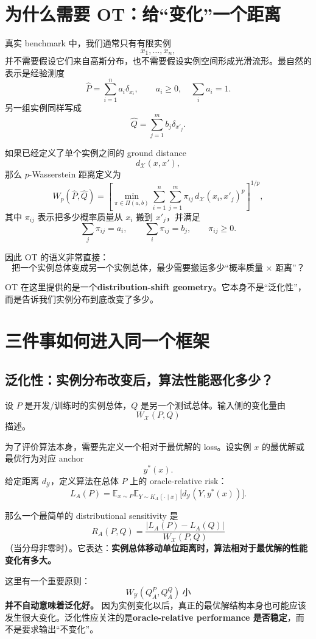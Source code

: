\documentclass[11pt,a4paper]{ctexart}
\begin{document}
\section{为什么需要 OT：给“变化”一个距离}

真实 benchmark 中，我们通常只有有限实例
\[
x_1,\ldots,x_n,
\]
并不需要假设它们来自高斯分布，也不需要假设实例空间形成光滑流形。最自然的表示是经验测度
\[
\widehat P=\sum_{i=1}^n a_i\delta_{x_i},
\qquad a_i\ge 0,\quad \sum_i a_i=1.
\]
另一组实例同样写成
\[
\widehat Q=\sum_{j=1}^m b_j\delta_{x'_j}.
\]

如果已经定义了单个实例之间的 ground distance
\[
d_{\mathcal X}(x,x'),
\]
那么 $p$-Wasserstein 距离定义为
\[
W_p(\widehat P,\widehat Q)
=
\left[
\min_{\pi\in\Pi(a,b)}
\sum_{i=1}^n\sum_{j=1}^m
\pi_{ij}\,d_{\mathcal X}(x_i,x'_j)^p
\right]^{1/p},
\]
其中 $\pi_{ij}$ 表示把多少概率质量从 $x_i$ 搬到 $x'_j$，并满足
\[
\sum_j\pi_{ij}=a_i,
\qquad
\sum_i\pi_{ij}=b_j,
\qquad
\pi_{ij}\ge 0.
\]

因此 OT 的语义非常直接：
\[
\boxed{\text{把一个实例总体变成另一个实例总体，最少需要搬运多少“概率质量 $\times$ 距离”？}}
\]

OT 在这里提供的是一个\textbf{distribution-shift geometry}。它本身不是“泛化性”，而是告诉我们实例分布到底改变了多少。

\section{三件事如何进入同一个框架}

\subsection{泛化性：实例分布改变后，算法性能恶化多少？}

设 $P$ 是开发/训练时的实例总体，$Q$ 是另一个测试总体。输入侧的变化量由
\[
W_{\mathcal X}(P,Q)
\]
描述。

为了评价算法本身，需要先定义一个相对于最优解的 loss。设实例 $x$ 的最优解或最优行为对应 anchor
\[
y^*(x).
\]
给定距离 $d_{\mathcal Y}$，定义算法在总体 $P$ 上的 oracle-relative risk：
\[
L_A(P)
=
\mathbb E_{x\sim P}
\mathbb E_{Y\sim K_A(\cdot\mid x)}
\bigl[d_{\mathcal Y}(Y,y^*(x))\bigr].
\]

那么一个最简单的 distributional sensitivity 是
\[
\boxed{
R_A(P,Q)
=
\frac{|L_A(P)-L_A(Q)|}{W_{\mathcal X}(P,Q)}
}
\]
（当分母非零时）。它表达：\textbf{实例总体移动单位距离时，算法相对于最优解的性能变化有多大。}

这里有一个重要原则：
\[
W_{\mathcal Y}(Q_A^P,Q_A^Q)\ \text{小}
\]
\textbf{并不自动意味着泛化好。} 因为实例变化以后，真正的最优解结构本身也可能应该发生很大变化。泛化性应关注的是\textbf{oracle-relative performance 是否稳定}，而不是要求输出“不变化”。
\end{document}
